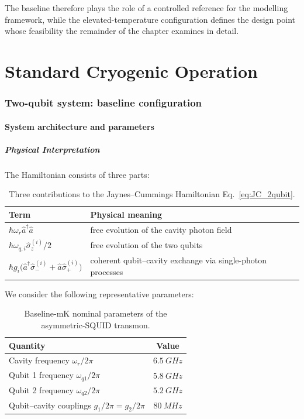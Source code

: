 The baseline therefore plays the role of a controlled reference for the modelling framework, while the elevated-temperature configuration defines the design point whose feasibility the remainder of the chapter examines in detail.

\part[Baseline Performance]{Standard Cryogenic Operation}

\section{Two-qubit system: baseline configuration}
\label{sec:two_qubit_baseline}

\subsection{System architecture and parameters}
\label{sec:system_params}

\subsubsection{Physical Interpretation}

The Hamiltonian consists of three parts:
\begin{table}[h]
\centering
\begin{tabular}{@{}lp{}@{}}
\toprule
\textbf{Term} & \textbf{Physical meaning} \\
\midrule
$\hbar\omega_r \hat{a}^\dagger\hat{a}$                                                 & free evolution of the cavity photon field \\
$\hbar\omega_{q,i}\hat{\sigma}_z^{(i)}/2$                                              & free evolution of the two qubits \\
$\hbar g_i\bigl(\hat{a}^\dagger\hat{\sigma}_-^{(i)} + \hat{a}\hat{\sigma}_+^{(i)}\bigr)$ & coherent qubit--cavity exchange via single-photon processes \\
\bottomrule
\end{tabular}
\caption{Three contributions to the Jaynes--Cummings Hamiltonian Eq.~\eqref{eq:JC_2qubit}.}
\label{tab:hamiltonian_terms}
\end{table}


We consider the following representative parameters:
\begin{table}[h]
\centering
\begin{tabular}{@{}lc@{}}
\toprule
\textbf{Quantity} & \textbf{Value} \\
\midrule
Cavity frequency $\omega_r/2\pi$       & $\SI{6.5}{GHz}$ \\
Qubit 1 frequency $\omega_{q1}/2\pi$    & $\SI{5.8}{GHz}$ \\
Qubit 2 frequency $\omega_{q2}/2\pi$    & $\SI{5.2}{GHz}$ \\
Qubit--cavity couplings $g_1/2\pi=g_2/2\pi$ & $\SI{80}{MHz}$ \\
\bottomrule
\end{tabular}
\caption{Baseline-mK nominal parameters of the asymmetric-SQUID transmon.}
\label{tab:heatsQ_baseline_params}
\end{table}

